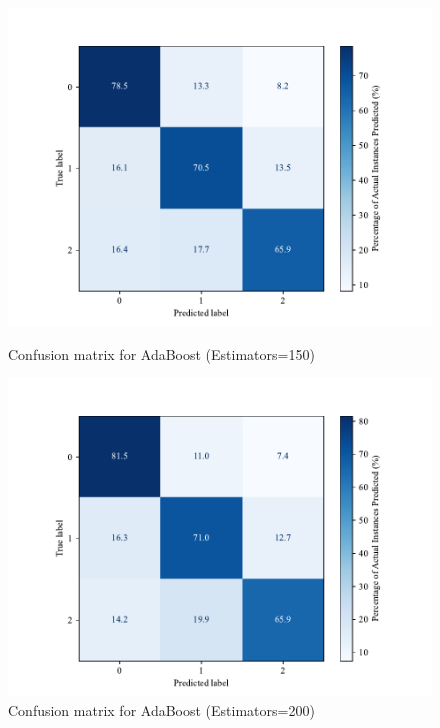         \begin{figure}[H]
        \centering
        \begin{minipage}[b]{0.45\textwidth}
        \centering
        \includegraphics[width=\textwidth]{images/confusion_matrix_adaboost150.pdf}
        \caption{Confusion matrix for AdaBoost (Estimators=150)}
        \label{fig:confusion_adaboost_150}
        \end{minipage}
        \hfill
        \begin{minipage}[b]{0.45\textwidth}
        \centering
        \includegraphics[width=\textwidth]{images/confusion_matrix_adaboost200.pdf}
        \caption{Confusion matrix for AdaBoost (Estimators=200)}
        \label{fig:confusion_adaboost_200}
        \end{minipage}
        \end{figure}



